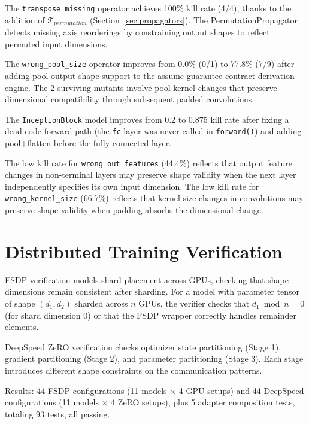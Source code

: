 \documentclass[11pt]{article}
\begin{document}
The \texttt{transpose\_missing} operator achieves 100\% kill rate
(4/4), thanks to the addition
of $\mathcal{T}_{\mathit{permutation}}$ (Section~\ref{sec:propagators}).
The PermutationPropagator detects missing axis reorderings by
constraining output shapes to reflect permuted input dimensions.

The \texttt{wrong\_pool\_size} operator improves from 0.0\% (0/1) to
77.8\% (7/9) after adding pool output shape support to the
assume-guarantee contract derivation engine.  The 2 surviving mutants
involve pool kernel changes that preserve dimensional compatibility
through subsequent padded convolutions.

The \texttt{InceptionBlock} model improves from 0.2 to 0.875 kill rate
after fixing a dead-code forward path (the \texttt{fc} layer was
never called in \texttt{forward()}) and adding pool+flatten before
the fully connected layer.

The low kill rate for \texttt{wrong\_out\_features} (44.4\%)
reflects that output feature changes in non-terminal layers may
preserve shape validity when the next layer independently specifies
its own input dimension.
The low kill rate for \texttt{wrong\_kernel\_size} (66.7\%)
reflects that kernel size changes in convolutions may preserve
shape validity when padding absorbs the dimensional change.


\section{Distributed Training Verification}\label{app:distributed}

FSDP verification models shard placement across GPUs, checking
that shape dimensions remain consistent after sharding.  For a model
with parameter tensor of shape $(d_1, d_2)$ sharded across $n$ GPUs,
the verifier checks that $d_1 \bmod n = 0$ (for shard dimension 0)
or that the FSDP wrapper correctly handles remainder elements.

DeepSpeed ZeRO verification checks optimizer state partitioning
(Stage 1), gradient partitioning (Stage 2), and parameter
partitioning (Stage 3).  Each stage introduces different
shape constraints on the communication patterns.

Results: 44 FSDP configurations (11 models $\times$ 4 GPU setups)
and 44 DeepSpeed configurations (11 models $\times$ 4 ZeRO setups),
plus 5 adapter composition tests, totaling 93 tests, all passing.
\end{document}

